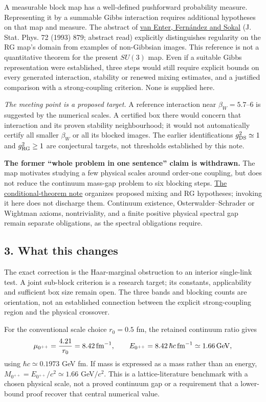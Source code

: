 \documentclass[11pt,a4paper]{article}
\begin{document}
A measurable block map has a well-defined pushforward probability
measure. Representing it by a summable Gibbs interaction requires
additional hypotheses on that map and measure. The abstract of
\href{https://arxiv.org/abs/hep-lat/9210032}{van Enter, Fernández and
Sokal} (J. Stat. Phys. 72 (1993) 879; abstract read) explicitly
distinguishes regularity on the RG map's domain from examples of
non-Gibbsian images. This reference is not a quantitative theorem for
the present \(SU(3)\) map. Even if a suitable Gibbs representation were
established, three steps would still require explicit bounds on every
generated interaction, stability or renewed mixing estimates, and a
justified comparison with a strong-coupling criterion. None is supplied
here.

\emph{The meeting point is a proposed target.} A reference interaction
near \(\beta_W=5.7\)--\(6\) is suggested by the numerical scales. A
certified box there would concern that interaction and its proven
stability neighbourhood; it would not automatically certify all smaller
\(\beta_W\) or all its blocked images. The earlier identifications
\(g_{\rm DS}^2\simeq1\) and \(g_{\rm RG}^2\ge1\) are conjectural
targets, not thresholds established by this note.

\textbf{The former ``whole problem in one sentence'' claim is
withdrawn.} The map motivates studying a few physical scales around
order-one coupling, but does not reduce the continuum mass-gap problem
to six blocking steps. \href{mass-gap-conditional-theorem.md}{The
conditional-theorem note} organizes proposed mixing and RG hypotheses;
invoking it here does not discharge them. Continuum existence,
Osterwalder--Schrader or Wightman axioms, nontriviality, and a finite
positive physical spectral gap remain separate obligations, as the
spectral obligations require.

\hypertarget{what-this-changes}{%
\subsection{3. What this changes}\label{what-this-changes}}

The exact correction is the Haar-marginal obstruction to an interior
single-link test. A joint sub-block criterion is a research target; its
constants, applicability and sufficient box size remain open. The three
bands and blocking counts are orientation, not an established connection
between the explicit strong-coupling region and the physical crossover.

For the conventional scale choice \(r_0=0.5\) fm, the retained continuum
ratio gives \[\mu_{0^{++}}=\frac{4.21}{r_0}=8.42\,{\rm fm}^{-1},\qquad
E_{0^{++}}=8.42\,\hbar c\,{\rm fm}^{-1}\simeq1.66\,{\rm GeV},\] using
\(\hbar c\simeq0.1973\) GeV fm. If mass is expressed as a mass rather
than an energy, \(M_{0^{++}}=E_{0^{++}}/c^2\simeq1.66\) GeV\(/c^2\).
This is a lattice-literature benchmark with a chosen physical scale, not
a proved continuum gap or a requirement that a lower-bound proof recover
that central numerical value.
\end{document}
